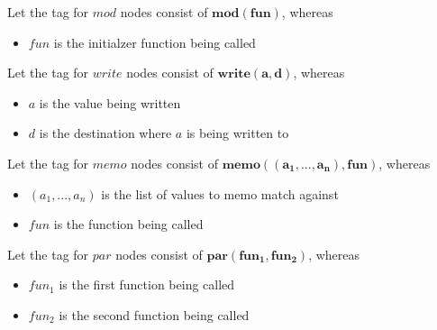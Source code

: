 \begin{definition}
Let the tag for $mod$ nodes consist of $\mathbf{mod(fun)}$, whereas
\begin{itemize}
\item $fun$ is the initialzer function being called
\end{itemize}
\end{definition}

\begin{definition}
Let the tag for $write$ nodes consist of $\mathbf{write(a, d)}$, whereas
\begin{itemize}
\item $a$ is the value being written
\item $d$ is the destination where $a$ is being written to 
\end{itemize}
\end{definition}

\begin{definition}
Let the tag for $memo$ nodes consist of $\mathbf{memo((a_1, ..., a_n), fun)}$, whereas
\begin{itemize}
\item $(a_1, ..., a_n)$ is the list of values to memo match against
\item $fun$ is the function being called
\end{itemize}
\end{definition}

\begin{definition}
Let the tag for $par$ nodes consist of $\mathbf{par(fun_1, fun_2)}$, whereas
\begin{itemize}
\item $fun_1$ is the first function being called
\item $fun_2$ is the second function being called
\end{itemize}
\end{definition}


\begin{figure}
\end{figure}

